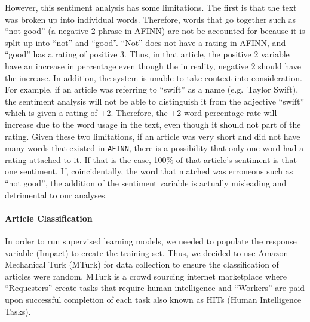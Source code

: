 \documentclass[10pt,letterpaper]{article}
\begin{document}
However, this sentiment analysis has some limitations. The first is that
the text was broken up into individual words. Therefore, words that go
together such as ``not good'' (a negative 2 phrase in AFINN) are not be
accounted for because it is split up into ``not'' and ``good''. ``Not''
does not have a rating in AFINN, and ``good'' has a rating of positive
3. Thus, in that article, the positive 2 variable have an increase in
percentage even though the in reality, negative 2 should have the
increase. In addition, the system is unable to take context into
consideration. For example, if an article was referring to ``swift'' as
a name (e.g.~Taylor Swift), the sentiment analysis will not be able to
distinguish it from the adjective ``swift'' which is given a rating of
+2. Therefore, the +2 word percentage rate will increase due to the word
usage in the text, even though it should not part of the rating. Given
these two limitations, if an article was very short and did not have
many words that existed in \texttt{AFINN}, there is a possibility that
only one word had a rating attached to it. If that is the case, 100\% of
that article's sentiment is that one sentiment. If, coincidentally, the
word that matched was erroneous such as ``not good'', the addition of
the sentiment variable is actually misleading and detrimental to our
analyses.

\hypertarget{article-classification}{%
\paragraph{Article Classification}\label{article-classification}}

In order to run supervised learning models, we needed to populate the
response variable (Impact) to create the training set. Thus, we decided
to use Amazon Mechanical Turk (MTurk) for data collection to ensure the
classification of articles were random. MTurk is a crowd sourcing
internet marketplace where ``Requesters'' create tasks that require
human intelligence and ``Workers'' are paid upon successful completion
of each task also known as HITs (Human Intelligence Tasks).
\end{document}
